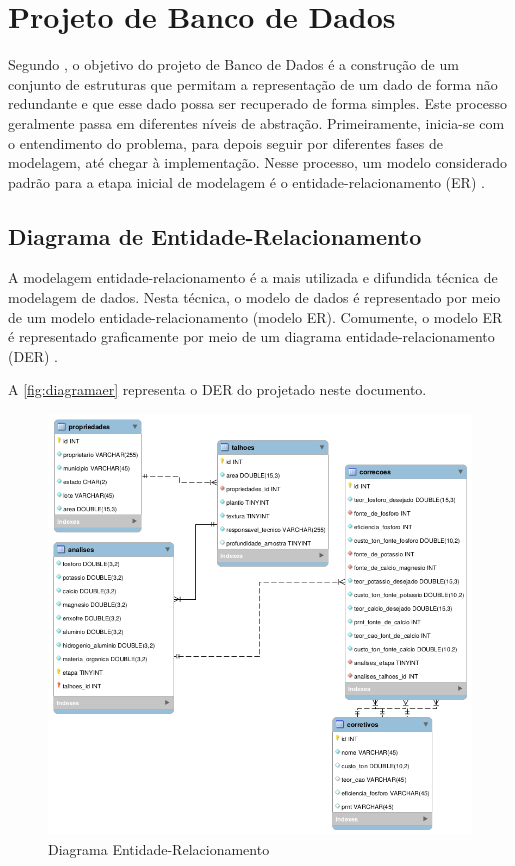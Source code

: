 \section{Projeto de Banco de Dados}
\label{sec:titSecBancoDados}

Segundo \cite{silberschatz2006sistema}, o objetivo do projeto de Banco de Dados é a construção de um conjunto de estruturas que permitam a representação de um dado de forma não redundante e que esse dado possa ser recuperado de forma simples. Este processo geralmente passa em diferentes níveis de abstração. Primeiramente, inicia-se com o entendimento do problema, para depois seguir por diferentes fases de modelagem, até chegar à implementação. Nesse processo, um modelo considerado padrão para a etapa inicial de modelagem é o entidade-relacionamento (ER) \cite{heuser2009projeto}.

\subsection{Diagrama de Entidade-Relacionamento}
\label{sec:titSecDiagER}

A modelagem entidade-relacionamento é a mais utilizada e difundida técnica de modelagem de dados. Nesta técnica, o modelo de dados é representado por meio de um modelo entidade-relacionamento (modelo ER). Comumente, o modelo ER é representado graficamente por meio de um diagrama entidade-relacionamento (DER) \cite{heuser2009projeto}.

A \autoref{fig:diagramaer} representa o DER do projetado neste documento.

\begin{figure}[H]
    \centering
    \includegraphics[width=13cm]{./dados/analise/diagramaer.png}
    \caption{Diagrama Entidade-Relacionamento}
    \label{fig:diagramaer}
\end{figure}


